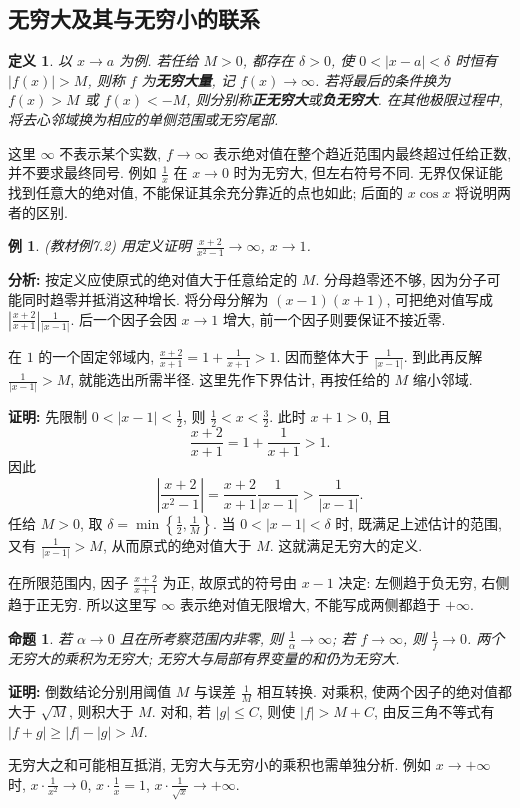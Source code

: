 \documentclass[UTF8,openany]{ctexbook}
\theoremstyle{chinesetextbook}
\newtheorem{definition}{定义}[section]
\newtheorem{example}{例}[section]
\newtheorem{proposition}{命题}[section]
\newenvironment{cnproof}{\par\indent\textbf{证明:} \ignorespaces}{\par}
\begin{document}
\subsection{无穷大及其与无穷小的联系}
\begin{definition}
以 $x\to a$ 为例. 若任给 $M>0$, 都存在 $\delta>0$, 使 $0<|x-a|<\delta$ 时恒有 $|f(x)|>M$, 则称 $f$ 为\textbf{无穷大量}, 记 $f(x)\to\infty$. 若将最后的条件换为 $f(x)>M$ 或 $f(x)<-M$, 则分别称\textbf{正无穷大}或\textbf{负无穷大}. 在其他极限过程中, 将去心邻域换为相应的单侧范围或无穷尾部.
\end{definition}
这里 $\infty$ 不表示某个实数, $f\to\infty$ 表示绝对值在整个趋近范围内最终超过任给正数, 并不要求最终同号. 例如 $\displaystyle\frac1x$ 在 $x\to0$ 时为无穷大, 但左右符号不同. 无界仅保证能找到任意大的绝对值, 不能保证其余充分靠近的点也如此; 后面的 $x\cos x$ 将说明两者的区别.
\begin{example}
(教材例7.2) 用定义证明 $\displaystyle \frac{x+2}{x^2-1}\to\infty$, $x\to1$.
\end{example}
\par\indent\textbf{分析:} 按定义应使原式的绝对值大于任意给定的 $M$. 分母趋零还不够, 因为分子可能同时趋零并抵消这种增长. 将分母分解为 $(x-1)(x+1)$, 可把绝对值写成 $\displaystyle\left|\frac{x+2}{x+1}\right|\frac1{|x-1|}$. 后一个因子会因 $x\to1$ 增大, 前一个因子则要保证不接近零.

在 $1$ 的一个固定邻域内, $\displaystyle\frac{x+2}{x+1}=1+\frac1{x+1}>1$. 因而整体大于 $\displaystyle\frac1{|x-1|}$. 到此再反解 $\displaystyle\frac1{|x-1|}>M$, 就能选出所需半径. 这里先作下界估计, 再按任给的 $M$ 缩小邻域.
\begin{cnproof}
先限制 $\displaystyle0<|x-1|<\frac12$, 则 $\displaystyle\frac12<x<\frac32$. 此时 $x+1>0$, 且
\[
\frac{x+2}{x+1}=1+\frac1{x+1}>1.
\]
因此
\[
\left|\frac{x+2}{x^2-1}\right|=\frac{x+2}{x+1}\frac1{|x-1|}>\frac1{|x-1|}.
\]
任给 $M>0$, 取 $\displaystyle\delta=\min\left\{\frac12,\frac1M\right\}$. 当 $0<|x-1|<\delta$ 时, 既满足上述估计的范围, 又有 $\displaystyle\frac1{|x-1|}>M$, 从而原式的绝对值大于 $M$. 这就满足无穷大的定义.

在所限范围内, 因子 $\displaystyle\frac{x+2}{x+1}$ 为正, 故原式的符号由 $x-1$ 决定: 左侧趋于负无穷, 右侧趋于正无穷. 所以这里写 $\infty$ 表示绝对值无限增大, 不能写成两侧都趋于 $+\infty$.
\end{cnproof}
\begin{proposition}
若 $\alpha\to0$ 且在所考察范围内非零, 则 $\displaystyle \frac1\alpha\to\infty$; 若 $f\to\infty$, 则 $\displaystyle \frac1f\to0$. 两个无穷大的乘积为无穷大; 无穷大与局部有界变量的和仍为无穷大.
\end{proposition}
\begin{cnproof}
倒数结论分别用阈值 $M$ 与误差 $\displaystyle \frac1M$ 相互转换. 对乘积, 使两个因子的绝对值都大于 $\sqrt M$, 则积大于 $M$. 对和, 若 $|g|\le C$, 则使 $|f|>M+C$, 由反三角不等式有 $|f+g|\ge|f|-|g|>M$.
\end{cnproof}
无穷大之和可能相互抵消, 无穷大与无穷小的乘积也需单独分析. 例如 $x\to+\infty$ 时, $\displaystyle x\cdot\frac1{x^2}\to0$, $\displaystyle x\cdot\frac1x=1$, $\displaystyle x\cdot\frac1{\sqrt x}\to+\infty$.
\end{document}
